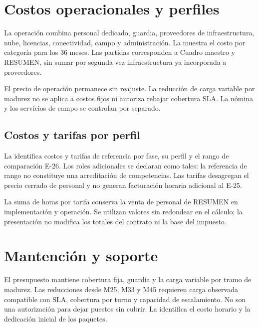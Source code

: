 \section{Costos operacionales y perfiles}\label{sec:eco-operacion}

La operación combina personal dedicado, guardia, proveedores de infraestructura, nube, licencias,
conectividad, campo y administración. La  muestra el costo por
categoría para los 36 meses. Las partidas corresponden a Cuadro maestro y RESUMEN, sin sumar
por segunda vez infraestructura ya incorporada a proveedores.



El precio de operación permanece sin reajuste. La reducción de carga variable por madurez no
se aplica a costos fijos ni autoriza rebajar cobertura SLA. La nómina y los servicios de
campo se controlan por separado.

\subsection{Costos y tarifas por perfil}\label{sec:eco-tarifas}

La  identifica costos y tarifas de referencia por fase, su perfil
y el rango de comparación E-26. Los roles adicionales se declaran como tales: la referencia
de rango no constituye una acreditación de competencias. Las tarifas desagregan el precio
cerrado de personal y no generan facturación horaria adicional al E-25.



La suma de horas por tarifa conserva la venta de personal de RESUMEN en implementación y
operación. Se utilizan valores sin redondear en el cálculo; la presentación no modifica los
totales del contrato ni la base del impuesto.

\section{Mantención y soporte}\label{sec:eco-mantencion}

El presupuesto mantiene cobertura fija, guardia y la carga variable por tramo de madurez.
Las reducciones desde M25, M33 y M45 requieren carga observada compatible con SLA, cobertura
por turno y capacidad de escalamiento. No son una autorización para dejar puestos sin cubrir.
La  identifica el costo horario y la dedicación inicial de los paquetes.

